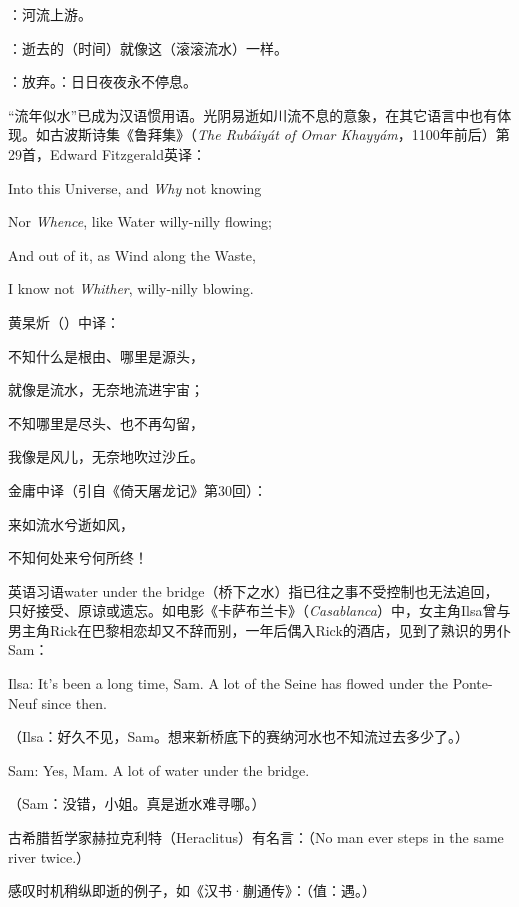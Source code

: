 {
\item {}：河流上游。
\item {}：逝去的（时间）就像这（滚滚流水）一样。
\item {}：放弃。：日日夜夜永不停息。
}
{
“流年似水”已成为汉语惯用语。光阴易逝如川流不息的意象，在其它语言中也有体现。如古波斯诗集《鲁拜集》（\emph{The Rubáiyát of Omar Khayyám}，1100年前后）第29首，Edward Fitzgerald英译：
\begin{lyquotepoeme}
Into this Universe, and \emph{Why} not knowing

Nor \emph{Whence}, like Water willy-nilly flowing;

And out of it, as Wind along the Waste,

I know not \emph{Whither}, willy-nilly blowing.
\end{lyquotepoeme}
黄杲炘（）中译：
\begin{lyquotepoem}
不知什么是{根由}、哪里是{源头}，

就像是流水，无奈地流进宇宙；

不知哪里是{尽头}、也不再勾留，

我像是风儿，无奈地吹过沙丘。
\end{lyquotepoem}
金庸中译（引自《倚天屠龙记》第30回）：
\begin{lyquotepoem}
来如流水兮逝如风，

不知何处来兮何所终！
\end{lyquotepoem}

英语习语water under the bridge（桥下之水）指已往之事不受控制也无法追回，只好接受、原谅或遗忘。如电影《卡萨布兰卡》（\emph{Casablanca}）中，女主角Ilsa曾与男主角Rick在巴黎相恋却又不辞而别，一年后偶入Rick的酒店，见到了熟识的男仆Sam：

\begin{lyquotepoem}
Ilsa: It's been a long time, Sam. A lot of the Seine has flowed under the Ponte-Neuf since then.

（Ilsa：好久不见，Sam。想来新桥底下的赛纳河水也不知流过去多少了。）

Sam: Yes, Mam. A lot of water under the bridge.

（Sam：没错，小姐。真是逝水难寻哪。）
\end{lyquotepoem}

古希腊哲学家赫拉克利特（Heraclitus）有名言：（No man ever steps in the same river twice.）

感叹时机稍纵即逝的例子，如《汉书·蒯通传》：（值：遇。）
}


